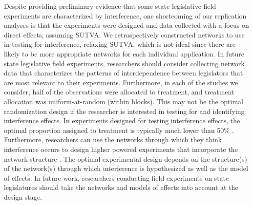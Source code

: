 \documentclass[12pt]{article}
\begin{document}
Despite providing preliminary evidence that some state legislative field experiments are characterized by interference, one shortcoming of our replication analyses is that the experiments were designed and data collected with a focus on direct effects, assuming SUTVA. We retrospectively constructed networks to use in testing for interference, relaxing SUTVA, which is not ideal since there are likely to be more appropriate networks for each individual application. In future state legislative field experiments, researchers should consider collecting network data that characterizes the patterns of interdependence between legislators that are most relevant to their experiments. Furthermore, in each of the studies we consider, half of the observations were allocated to treatment, and treatment allocation was uniform-at-random (within blocks). This may not be the optimal randomization design if the researcher is interested in testing for and identifying interference effects. In experiments designed for testing interference effects, the optimal proportion assigned to treatment is typically much lower than 50\% \citep{bowers2016models}. Furthermore,  researchers can use the networks through which they think interference occurs to design higher powered experiments that incorporate the network structure \citep{bowers2016models}. The optimal experimental design depends on the structure(s) of the network(s) through which interference is hypothesized as well as the model of effects. In future work, researchers conducting field experiments on state legislatures should take the networks and models of effects into account at the design stage.




\end{document}

